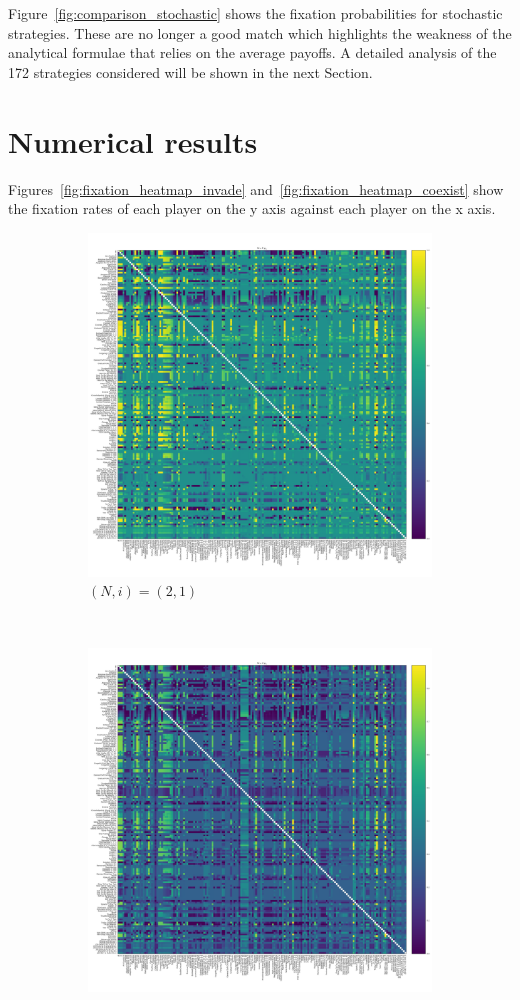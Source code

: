 \documentclass{article}
\begin{document}
Figure~\ref{fig:comparison_stochastic} shows the fixation probabilities for
stochastic strategies. These are no longer a good match which highlights the
weakness of the analytical formulae that relies on the average payoffs. A
detailed analysis of the 172 strategies considered will be shown in the next
Section.

\section{Numerical results}\label{sec:numerical_results}

Figures~\ref{fig:fixation_heatmap_invade}
and~\ref{fig:fixation_heatmap_coexist} show the fixation rates of each
player on the y axis against each player on the x axis.

\begin{figure}[!hbtp]
    \centering
    \begin{subfigure}[t]{.3\textwidth}
        \centering
        \includegraphics[width=.8\textwidth]{../img/fixation_heatmap_2_invade.pdf}
        \caption{\((N,i)=(2, 1)\)}
    \end{subfigure}%
    ~
    \begin{subfigure}[t]{.3\textwidth}
        \centering
        \includegraphics[width=.8\textwidth]{../img/fixation_heatmap_4_invade.pdf}

\end{subfigure}
\end{figure}
\end{document}
